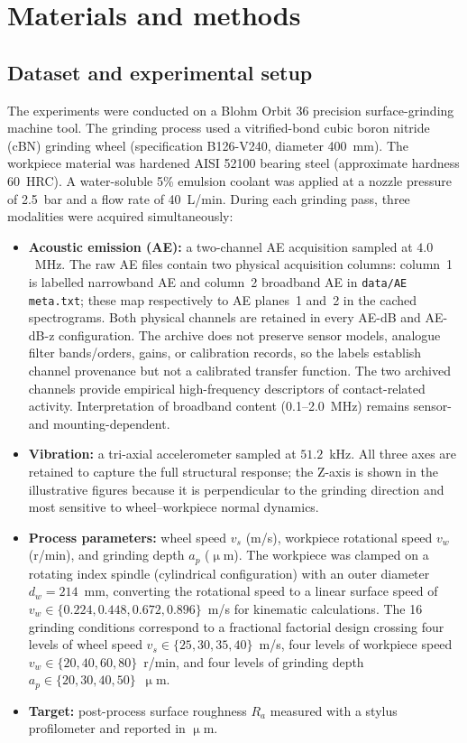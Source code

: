 \section{Materials and methods}\label{materials-and-methods}

\subsection{Dataset and experimental setup}\label{dataset-and-experimental-setup}

The experiments were conducted on a Blohm Orbit 36 precision surface-grinding machine tool. The grinding process used a vitrified-bond cubic boron nitride (cBN) grinding wheel (specification B126-V240, diameter 400~mm). The workpiece material was hardened AISI 52100 bearing steel (approximate hardness 60~HRC). A water-soluble 5\% emulsion coolant was applied at a nozzle pressure of 2.5~bar and a flow rate of 40~L/min. During each grinding pass, three modalities were acquired simultaneously:

\begin{itemize}
\tightlist
\item
  \textbf{Acoustic emission (AE):} a two-channel AE acquisition sampled at
  $4.0$~MHz. The raw AE files contain two physical acquisition columns:
  column~1 is labelled narrowband AE and column~2 broadband AE in
  \texttt{data/AE meta.txt}; these map respectively to AE planes~1 and~2 in
  the cached spectrograms. Both physical channels are retained in every
  AE-dB and AE-dB-z configuration. The archive does not preserve sensor
  models, analogue filter bands/orders, gains, or calibration records, so
  the labels establish channel provenance but not a calibrated transfer
  function. The two archived channels provide empirical high-frequency
  descriptors of contact-related activity. Interpretation of broadband
  content (0.1--2.0~MHz) remains sensor- and mounting-dependent.
\item
  \textbf{Vibration:} a tri-axial accelerometer sampled at $51.2$~kHz.
  All three axes are retained to capture the full structural response; the Z-axis is shown in the illustrative
  figures because it is perpendicular to the grinding direction and most
  sensitive to wheel--workpiece normal dynamics.
\item
  \textbf{Process parameters:} wheel speed $v_s$ (m/s), workpiece rotational speed $v_w$ (r/min), and grinding depth $a_p$ (\(\upmu\)m). The workpiece was clamped on a rotating index spindle (cylindrical configuration) with an outer diameter $d_w = 214$~mm, converting the rotational speed to a linear surface speed of $v_w \in \{0.224, 0.448, 0.672, 0.896\}$~m/s for kinematic calculations. The 16 grinding conditions correspond to a fractional factorial design crossing four levels of wheel speed $v_s \in \{25, 30, 35, 40\}$~m/s, four levels of workpiece speed $v_w \in \{20, 40, 60, 80\}$~r/min, and four levels of grinding depth $a_p \in \{20, 30, 40, 50\}$~\(\upmu\)m.
\item
  \textbf{Target:} post-process surface roughness $R_a$ measured with a
  stylus profilometer and reported in \(\upmu\)m.
\end{itemize}

